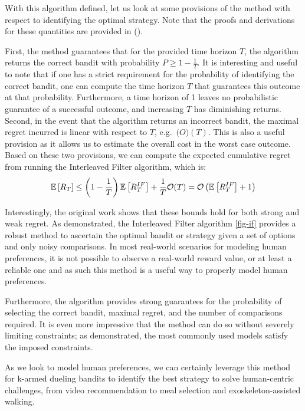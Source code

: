 \documentclass[
  letterpaper,
  numbers=noenddot,
  DIV=11]{scrreprt}
\theoremstyle{plain}
\theoremstyle{definition}
\theoremstyle{remark}
\begin{document}
With this algorithm defined, let us look at some provisions of the
method with respect to identifying the optimal strategy. Note that the
proofs and derivations for these quantities are provided in
().

First, the method guarantees that for the provided time horizon \(T\),
the algorithm returns the correct bandit with probability
\(P \ge 1 - \frac{1}{T}\). It is interesting and useful to note that if
one has a strict requirement for the probability of identifying the
correct bandit, one can compute the time horizon \(T\) that guarantees
this outcome at that probability. Furthermore, a time horizon of 1
leaves no probabilistic guarantee of a successful outcome, and
increasing \(T\) has diminishing returns. Second, in the event that the
algorithm returns an incorrect bandit, the maximal regret incurred is
linear with respect to \(T\), e.g.~\(\mathcal(O)(T)\). This is also a
useful provision as it allows us to estimate the overall cost in the
worst case outcome. Based on these two provisions, we can compute the
expected cumulative regret from running the Interleaved Filter
algorithm, which is:
\[\mathbb{E}\left[R_T\right] \le \left(1 - \frac{1}{T}\right) \mathbb{E}\left[ R_T^{IF} \right] + \frac{1}{T}\mathcal{O}(T) \\
= \mathcal{O}\left(\mathbb{E}\left[ R_T^{IF} \right] + 1\right)\]

Interestingly, the original work shows that these bounds hold for both
strong and weak regret. As demonstrated, the Interleaved Filter
algorithm \hyperref[fig-if]{{[}fig-if{]}} provides a robust method to
ascertain the optimal bandit or strategy given a set of options and only
noisy comparisons. In most real-world scenarios for modeling human
preferences, it is not possible to observe a real-world reward value, or
at least a reliable one and as such this method is a useful way to
properly model human preferences.

Furthermore, the algorithm provides strong guarantees for the
probability of selecting the correct bandit, maximal regret, and the
number of comparisons required. It is even more impressive that the
method can do so without severely limiting constraints; as demonstrated,
the most commonly used models satisfy the imposed constraints.

As we look to model human preferences, we can certainly leverage this
method for k-armed dueling bandits to identify the best strategy to
solve human-centric challenges, from video recommendation to meal
selection and exoskeleton-assisted walking.
\end{document}
